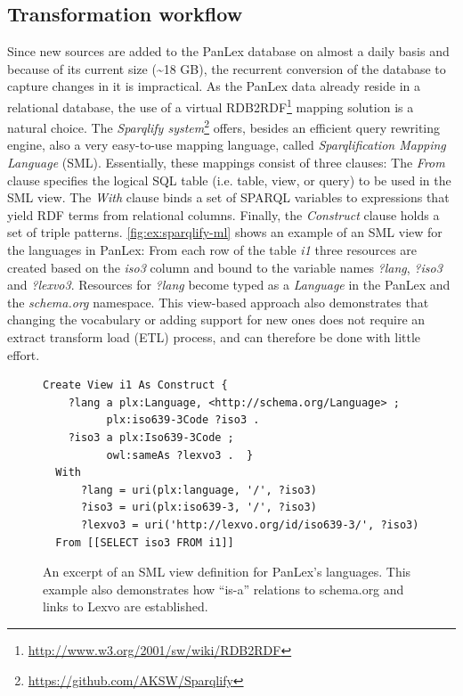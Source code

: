 \documentclass[sw]{iosart2c}
\begin{document}
\subsection{Transformation workflow}
\label{sec:conversion}
Since new sources are added to the PanLex database on almost a daily basis and because of its current size (\textasciitilde18 GB), the recurrent conversion of the database to capture changes in it is impractical.
As the PanLex data already reside in a relational database, the use of a virtual RDB2RDF\footnote{\url{http://www.w3.org/2001/sw/wiki/RDB2RDF}} mapping solution is a natural choice.
The \emph{Sparqlify system}\footnote{\url{https://github.com/AKSW/Sparqlify}} offers, besides an efficient query rewriting engine, also a very easy-to-use mapping language, called \emph{Sparqlification Mapping Language} (SML).
Essentially, these mappings consist of three clauses:
The \emph{From} clause specifies the logical SQL table (i.e. table, view, or
query) to be used in the SML view.
The \emph{With} clause binds a set of SPARQL variables to expressions that
yield RDF terms from relational columns.
Finally, the \emph{Construct} clause holds a set of triple patterns.
\autoref{fig:ex:sparqlify-ml} shows an example of an SML view for the
languages in PanLex: From each row of the table \emph{i1} three resources are
created based on the \emph{iso3} column and 
bound to the variable names \emph{?lang}, \emph{?iso3} and \emph{?lexvo3}.
Resources for \emph{?lang} become typed as a \emph{Language} in the PanLex and the \emph{schema.org} namespace.
This view-based approach also demonstrates that changing the vocabulary or
adding support for new ones does not require an extract transform load (ETL) process,
and can therefore be done with little effort.

\begin{figure}
\centering
\begin{lstlisting}
Create View i1 As Construct {
    ?lang a plx:Language, <http://schema.org/Language> ;
          plx:iso639-3Code ?iso3 .
    ?iso3 a plx:Iso639-3Code ;
          owl:sameAs ?lexvo3 .  }
  With
      ?lang = uri(plx:language, '/', ?iso3)
      ?iso3 = uri(plx:iso639-3, '/', ?iso3)
      ?lexvo3 = uri('http://lexvo.org/id/iso639-3/', ?iso3)
  From [[SELECT iso3 FROM i1]]
\end{lstlisting}
\caption{An excerpt of an SML view definition for PanLex's languages. This
example also demonstrates how ``is-a'' relations to schema.org and links to Lexvo are established.}
\label{fig:ex:sparqlify-ml}
\end{figure}
\end{document}
